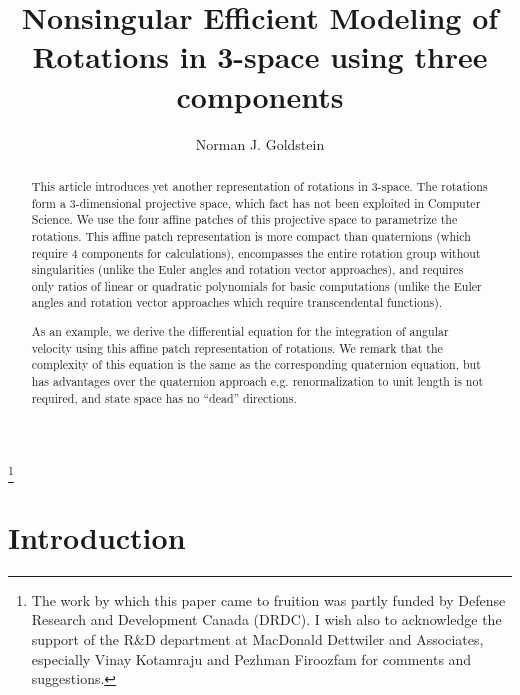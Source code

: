 \documentclass{gen-j-l}
\theoremstyle{definition}
\theoremstyle{remark}
\numberwithin{equation}{section}
\begin{document}
\title{Nonsingular Efficient Modeling of \\ Rotations in 3-space using
three components}



\author{Norman J. Goldstein }


\address{Research \& Development, MacDonald Dettwiler and Associates \\
13800 Commerce Parkway, Richmond, BC, Canada}
\curraddr{}
\thanks{The work by which this paper came to fruition was partly funded by
Defense Research and Development Canada (DRDC).  I wish also to 
acknowledge the support of the R\&D department at MacDonald Dettwiler
and Associates, especially Vinay Kotamraju and Pezhman Firoozfam for
comments and suggestions.}





\date{}

\dedicatory{}



\begin{abstract}
This article introduces yet another representation of
rotations in 3-space.  The rotations form a 3-dimensional
projective space, which fact has not been exploited in 
Computer Science.  We use the four affine patches of this
projective space to parametrize the rotations.  This affine
patch representation is more compact than quaternions (which
require 4 components for calculations), encompasses the entire
rotation group without singularities 
(unlike the Euler angles and rotation vector approaches), and requires only 
ratios of linear or quadratic polynomials for basic computations 
(unlike the Euler angles and rotation vector approaches 
which require transcendental functions).

As an example, we derive the differential equation
for the integration of angular velocity using this affine patch
representation of rotations.  We remark that the complexity of
this equation is the same as the corresponding quaternion equation,
but has advantages over the quaternion approach e.g.
renormalization to unit length is not required, and state space has
no ``dead'' directions.
\end{abstract}

\maketitle



\section{Introduction}
\end{document}
